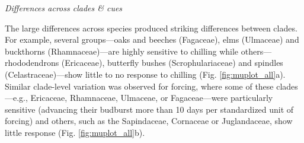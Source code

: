 \documentclass[11pt]{article}
\begin{document}
\emph{Differences across clades \& cues}

The large differences across species produced striking differences between clades. For example, several groups---oaks and
beeches (Fagaceae), elms (Ulmaceae) and buckthorns (Rhamnaceae)---are highly sensitive to chilling while others---rhododendrons (Ericaceae), butterfly bushes (Scrophulariaceae) and spindles (Celastraceae)---show little to no response to chilling  (Fig. \ref{fig:muplot_all}a). %
Similar clade-level variation was observed for forcing, where some of these clades---e.g., Ericaceae, Rhamnaceae, Ulmaceae, or Fagaceae---were particularly sensitive (advancing their budburst more than 10 days per standardized unit of forcing) and others, such as the Sapindaceae, Cornaceae or Juglandaceae, show little response (Fig. \ref{fig:muplot_all}b). %
\end{document}
